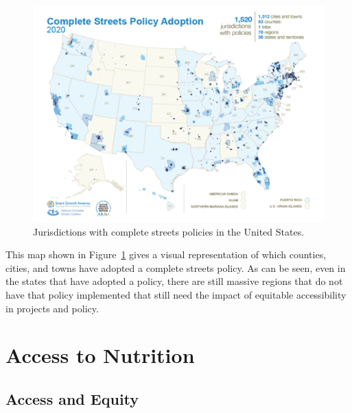 \documentclass[
  letterpaper,
  DIV=11,
  numbers=noendperiod]{scrreport}
\begin{document}
\begin{figure}[t]

{\centering \includegraphics[width=6in,height=\textheight]{images/completestreets.png}

}

\caption{\label{fig-completestreets}Jurisdictions with complete streets
policies in the United States.}

\end{figure}

This map shown in Figure~\ref{fig-completestreets} gives a visual
representation of which counties, cities, and towns have adopted a
complete streets policy. As can be seen, even in the states that have
adopted a policy, there are still massive regions that do not have that
policy implemented that still need the impact of equitable accessibility
in projects and policy.

\hypertarget{access-to-nutrition}{%
\section{Access to Nutrition}\label{access-to-nutrition}}

\hypertarget{access-and-equity}{%
\subsection{Access and Equity}\label{access-and-equity}}
\end{document}
